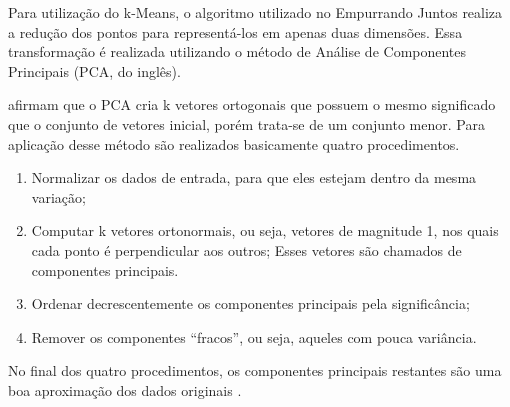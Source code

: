 Para utilização do k-Means, o algoritmo utilizado no Empurrando Juntos realiza a redução dos pontos para 
representá-los em apenas duas dimensões. Essa transformação é realizada utilizando o método de Análise de 
Componentes Principais (PCA, do inglês). 

 afirmam que o PCA cria k vetores ortogonais que possuem o mesmo significado que o conjunto
de vetores inicial, porém trata-se de um conjunto menor. Para aplicação desse método são realizados basicamente quatro procedimentos.

\begin{enumerate}
 \item Normalizar os dados de entrada, para que eles estejam dentro da mesma variação;
 \item Computar k vetores ortonormais, ou seja, vetores de magnitude 1, nos quais cada ponto é perpendicular aos outros;
  \subitem Esses vetores são chamados de componentes principais.
 \item Ordenar decrescentemente os componentes principais pela significância;
 \item Remover os componentes ``fracos'', ou seja, aqueles com pouca variância.
\end{enumerate}

No final dos quatro procedimentos, os componentes principais restantes são uma boa aproximação dos dados originais \cite{han2011data}.



